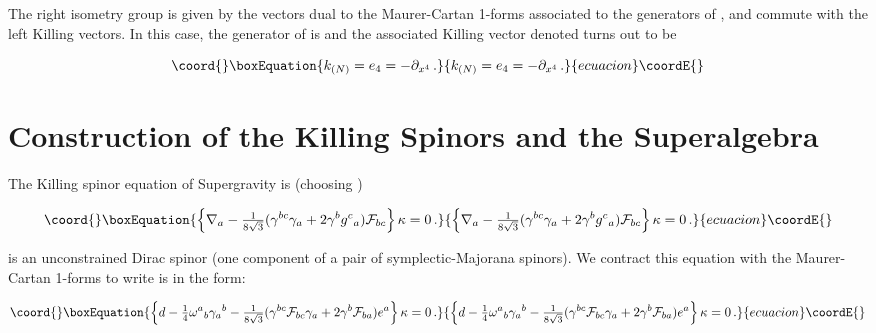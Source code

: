 \documentclass[12pt,a4paper]{article}
\begin{document}
The right isometry group is given by the vectors dual to the
Maurer-Cartan 1-forms \coordHE{} associated to the generators of
\coordHE{}, and commute with the left Killing vectors. In this case, the
generator of \coordHE{} is \coordHE{} and the associated Killing vector
denoted \coordHE{} turns out to be

\begin{equation}\coord{}\boxEquation{
k_{(N)} = e_{4}= -\partial_{x^{4}}\, . 
}{
k_{(N)} = e_{4}= -\partial_{x^{4}}\, . 
}{ecuacion}\coordE{}\end{equation}


\section*{Construction of the  Killing  Spinors and the Superalgebra}

The Killing spinor equation of \coordHE{} Supergravity is (choosing
\coordHE{}) \cite{Cremmer:1980gs,Lozano-Tellechea:2002pn}


\begin{equation}\coord{}\boxEquation{
\left\{ \nabla_{a}
-{\textstyle\frac{1}{8\sqrt{3}}}
(\gamma^{bc}\gamma_{a}+2\gamma^{b}g^{c}{}_{a})
\mathcal{F}_{bc}\right\}\kappa=0\, .
}{
\left\{ \nabla_{a}
-{\textstyle\frac{1}{8\sqrt{3}}}
(\gamma^{bc}\gamma_{a}+2\gamma^{b}g^{c}{}_{a})
\mathcal{F}_{bc}\right\}\kappa=0\, .
}{ecuacion}\coordE{}\end{equation}

\noindent
\myHighlight{$\kappa$}\coordHE{} is an unconstrained Dirac spinor (one component of a pair of
symplectic-Majorana spinors).  We contract this equation with the
Maurer-Cartan 1-forms \coordHE{} to write is in the form:

\begin{equation}\coord{}\boxEquation{
\left\{d -{\textstyle\frac{1}{4}}\omega^{a}{}_{b}\gamma_{a}{}^{b}  
-{\textstyle\frac{1}{8\sqrt{3}}}
(\gamma^{bc}\mathcal{F}_{bc}
\gamma_{a}+2\gamma^{b}\mathcal{F}_{ba})e^{a}
\right\}\kappa=0\, .
}{
\left\{d -{\textstyle\frac{1}{4}}\omega^{a}{}_{b}\gamma_{a}{}^{b}  
-{\textstyle\frac{1}{8\sqrt{3}}}
(\gamma^{bc}\mathcal{F}_{bc}
\gamma_{a}+2\gamma^{b}\mathcal{F}_{ba})e^{a}
\right\}\kappa=0\, .
}{ecuacion}\coordE{}\end{equation}
\end{document}

